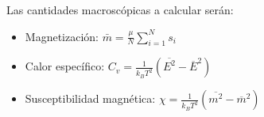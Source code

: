 \documentclass[a4paper,10pt]{paper}
\begin{document}
 Las cantidades macrosc\'opicas a calcular ser\'an:
 \begin{itemize}
  \item Magnetizaci\'on: $\bar{m} = \frac{\mu}{N} \sum\limits_{i=1}^{N} s_i$
  \item Calor espec\'ifico: $C_v = \frac{1}{k_B T^2}(\overline{E^2} -\overline{E}^2)$
  \item Susceptibilidad magn\'etica: $\chi = \frac{1}{k_B T^2}(\overline{m^2} -\overline{m}^2)$
 \end{itemize}
\end{document}
